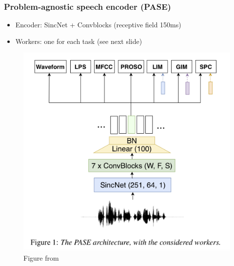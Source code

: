 \documentclass[table]{beamer}
\begin{document}


\begin{frame}
\frametitle{Problem-agnostic speech encoder (PASE)}

		\begin{itemize}
			\item Encoder: SincNet \citep{syncnet2018} + Convblocks (receptive field 150ms)
			\item Workers: one for each task (see next slide)
		\end{itemize} 


		\begin{figure}
			\centering
			\includegraphics[scale=0.27]	{PASE} 
			\caption{Figure from \citep{pascual2019}}
			\end{figure}

\end{frame}

\end{document}
